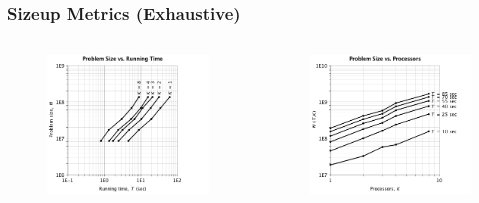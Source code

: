 \documentclass[handout,10pt]{beamer}
\begin{document}
\begin{frame}
	\frametitle{Sizeup Metrics (Exhaustive)}
\begin{columns}
	\vspace{-1em}
	\begin{figure}
	\centering
	\includegraphics[scale = 0.25]{e_size_4.png}
	\end{figure}
	\vspace{-2em}
	\begin{figure}
	\centering
	\includegraphics[scale = 0.25]{e_size_3.png}
	\end{figure}
\begin{minipage}[c][.6\textheight][c]{\linewidth}
	\vspace{-1em}

\end{minipage}
\end{columns}
\end{frame}
\end{document}
